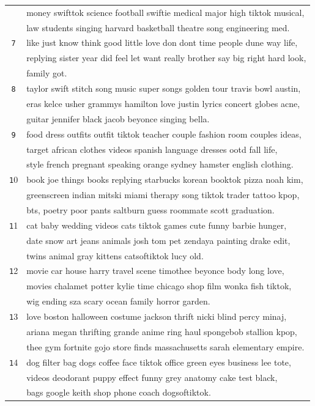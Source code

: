 \documentclass[acmtog]{acmart}
\begin{document}
\begin{table}[ht]
\begin{tabular}{cl}
    \texttt & money swifttok science football swiftie medical major high tiktok musical, \\
    \texttt & law students singing harvard basketball theatre song engineering med. \\
    \texttt 7 & like just know think good little love don dont time people dune way life, \\
    \texttt & replying sister year did feel let want really brother say big right hard look, \\
    \texttt & family got. \\
    \texttt 8 & taylor swift stitch song music super songs golden tour travis bowl austin, \\
    \texttt & eras kelce usher grammys hamilton love justin lyrics concert globes acne, \\
    \texttt & guitar jennifer black jacob beyonce singing bella. \\
    \texttt 9 & food dress outfits outfit tiktok teacher couple fashion room couples ideas, \\
    \texttt & target african clothes videos spanish language dresses ootd fall life, \\
    \texttt & style french pregnant speaking orange sydney hamster english clothing. \\
    \texttt 10 & book joe things books replying starbucks korean booktok pizza noah kim, \\
    \texttt & greenscreen indian mitski miami therapy song tiktok trader tattoo kpop, \\
    \texttt & bts, poetry poor pants saltburn guess roommate scott graduation. \\
    \texttt 11 & cat baby wedding videos cats tiktok games cute funny barbie hunger, \\
    \texttt & date snow art jeans animals josh tom pet zendaya painting drake edit, \\
    \texttt & twins animal gray kittens catsoftiktok lucy old. \\
    \texttt 12 & movie car house harry travel scene timothee beyonce body long love, \\
    \texttt & movies chalamet potter kylie time chicago shop film wonka fish tiktok, \\
    \texttt & wig ending sza scary ocean family horror garden. \\
    \texttt 13 & love boston halloween costume jackson thrift nicki blind percy minaj, \\
    \texttt & ariana megan thrifting grande anime ring haul spongebob stallion kpop, \\
    \texttt & thee gym fortnite gojo store finds massachusetts sarah elementary empire. \\
    \texttt 14 & dog filter bag dogs coffee face tiktok office green eyes business lee tote, \\
    \texttt & videos deodorant puppy effect funny grey anatomy cake test black, \\
    \texttt & bags google keith shop phone coach dogsoftiktok. \\
    \bottomrule
  \end{tabular}
\end{table}
\end{document}
